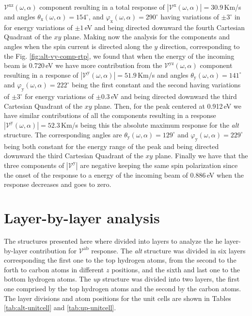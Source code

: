 \documentclass[prb,11pt,tightenlines,twocolumn,aps]{revtex4-1}
\begin{document}
$\mathcal{V}^{\mathrm{xz}}(\omega,\alpha)$ component resulting in a total
response of $|\mathcal{V}^{\mathrm{x}}(\omega,\alpha)|=30.9$\,Km/s and angles
$\theta_{\mathrm{x}}(\omega,\alpha)=154^{\circ}$, and
$\varphi_{\mathrm{x}}(\omega,\alpha)=290^{\circ}$ having variations of
$\pm3^{\circ}$ in for energy variations of $\pm1$\,eV and being directed
downward the fourth Cartesian Quadrant of the $xy$ plane.
% 
Making now the analysis for the components and angles when the spin current is
directed along the $y$ direction, corresponding to the Fig.
% 
\ref{fig:alt-vy-comp-rtp}, we found that when the energy of the incoming beam is
0.720\,eV we have more contribution from the
$\mathcal{V}^{\mathrm{yz}}(\omega,\alpha)$ component resulting in a response of
$|\mathcal{V}^{\mathrm{y}}(\omega,\alpha)|=51.9$\,Km/s and angles
$\theta_{\mathrm{y}}(\omega,\alpha)=141^{\circ}$ and
$\varphi_{\mathrm{y}}(\omega,\alpha)=222^{\circ}$ being the first constant and
the second having variations of $\pm3^{\circ}$ for energy variations of
$\pm0.3$\,eV and being directed downward the third Cartesian Quadrant of the
$xy$ plane.
% 
Then, for the peak centered at 0.912\,eV we have similar contributions of all
the components resulting in a response
$|\mathcal{V}^{\mathrm{y}}(\omega,\alpha)|=52.3$\,Km/s being this the absolute
maximum response for the \emph{alt} structure. The corresponding angles are
$\theta_{\mathrm{y}}(\omega,\alpha)=129^{\circ}$ and
$\varphi_{\mathrm{y}}(\omega,\alpha)=229^{\circ}$ being both constant for the
energy range of the peak and being directed downward the third Cartesian
Quadrant of the $xy$ plane.
% 
Finally we have that the three components of $|\mathcal{V}^{\mathrm{y}}|$ are
negative keeping the same spin polarization since the onset of the response to a
energy of the incoming beam of 0.886\,eV when the response decreases and goes to
zero.


\section{Layer-by-layer analysis} %
\label{sec:res-layer_by_layer_analysis}

The structures presented here where divided into layers to analyze the he
layer-by-layer contribution for $\mathcal{V}^{\mathrm{ab}}$ response. The
\emph{alt} structure was divided in six layers corresponding the first one to
the top hydrogen atoms, from the second to the forth to carbon atoms in
different $z$ positions, and the sixth and last one to the bottom hydrogen
atoms. The \emph{up} structure was divided into two layers, the first one
comprised by the top hydrogen atoms and the second by the carbon atoms. The
layer divisions and atom positions for the unit cells are shown in Tables
\ref{tab:alt-unitcell} and \ref{tab:up-unitcell}.
\end{document}
